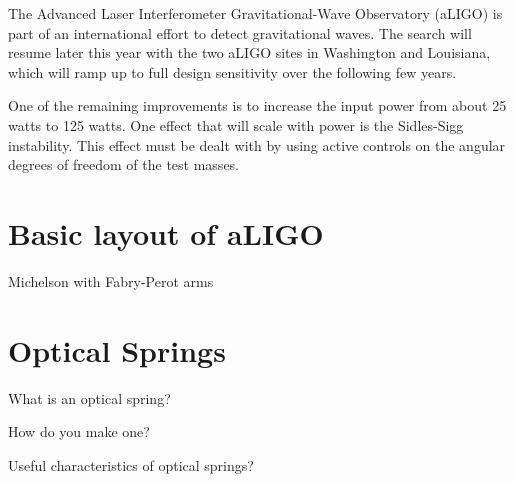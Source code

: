 The Advanced Laser Interferometer Gravitational-Wave Observatory (aLIGO) is part of an international effort to detect gravitational waves. 
The search will resume later this year with the two aLIGO sites in Washington and Louisiana, which will ramp up to full design sensitivity over the following few years.

One of the remaining improvements is to increase the input power from about 25 watts to 125 watts.
One effect that will scale with power is the Sidles-Sigg instability. 
This effect must be dealt with by using active controls on the angular degrees of freedom of the test masses.

\section{Basic layout of aLIGO}

Michelson with Fabry-Perot arms

\section{Optical Springs}

What is an optical spring?

How do you make one?

Useful characteristics of optical springs?

